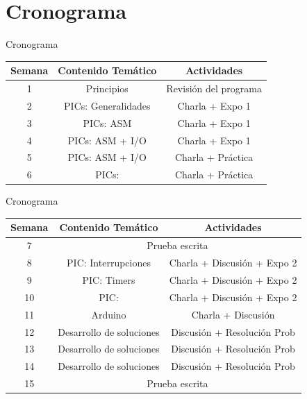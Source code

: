 \documentclass[handout,xcolor=dvipsnames]{beamer}
\newcommand{\pageframe}[1]{\frame{\begin{center}{ \Huge #1 }\end{center}}}
\begin{document}
\section{Cronograma}

\pageframe{Cronograma}

\begin{frame}{Cronograma}
 \begin{center}
 {\small
  \begin{tabular}{|c|c|c|}\hline
  
   Semana 	& \multicolumn{1}{c|}{Contenido Temático} & \multicolumn{1}{c|}{Actividades} \\ \hline \hline
   1 		& Principios 		&  Revisión del programa \\ \hline
   2 		& PICs: Generalidades & Charla + Expo 1 \\ \hline
   3 		& PICs: ASM			& Charla + Expo 1\\ \hline
   4 		& PICs: ASM + I/O  		& Charla + Expo 1 \\ \hline
   5		& PICs: ASM	+ I/O	& Charla + Práctica \\ \hline
   6 		& PICs: 	& Charla + Práctica \\ \hline

  
  \end{tabular}}
 \end{center}
\end{frame}

\begin{frame}{Cronograma}
 \begin{center}
 {\small
  \begin{tabular}{|c|c|c|}\hline
  
   Semana 	& \multicolumn{1}{c|}{Contenido Temático} & \multicolumn{1}{c|}{Actividades} \\ \hline \hline
   7 		& \multicolumn{2}{c|}{Prueba escrita} \\ \hline
   8 		& PIC: Interrupciones	& Charla + Discusión + Expo 2 \\ \hline
   9 		& PIC: Timers 		& Charla + Discusión + Expo 2\\ \hline
   10 		& PIC: 		& Charla + Discusión + Expo 2 \\ \hline
   11		& Arduino		& Charla + Discusión  \\ \hline
   12 		& Desarrollo de soluciones & Discusión + Resolución Prob \\ \hline
   13 		& Desarrollo de soluciones & Discusión + Resolución Prob \\ \hline
   14		& Desarrollo de soluciones & Discusión + Resolución Prob \\ \hline
   15 		& \multicolumn{2}{c|}{Prueba escrita}  \\ \hline
  \end{tabular}}
 \end{center}
\end{frame}
\end{document}
